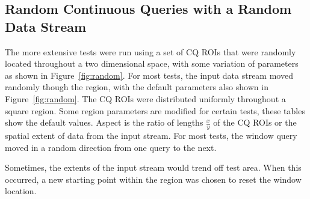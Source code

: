 \documentclass{ucdthesis}       %
\begin{document}
\subsection{Random Continuous Queries with a Random Data Stream}
\label{sec:random}

The more extensive tests were run using a set of \ac{CQ} \acp{ROI} that
were randomly located throughout a two dimensional space, with some
variation of parameters as shown in Figure~\ref{fig:random}.  For most
tests, the input data stream moved randomly though the region, with
the default parameters also shown in Figure~\ref{fig:random}.  The
\ac{CQ} \acp{ROI} were distributed uniformly throughout a square region.
Some region parameters are modified for certain tests, these tables
show the default values.  Aspect is the ratio of lengths $\frac{x}{y}$
of the \ac{CQ} \acp{ROI} or the spatial extent of data from the input
stream.  For most tests, the window query moved in a random direction
from one query to the next.

Sometimes, the extents of the input stream would trend off test area.
When this occurred, a new starting point within the region was chosen
to reset the window location.
\end{document}
